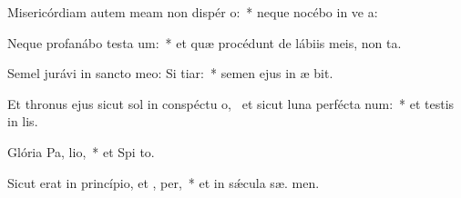 \item Misericórdiam autem meam non dispér  o:~* neque nocébo in ve a:
\item Neque profanábo testa um:~* et quæ procédunt de lábiis meis, non  ta.
\item Semel jurávi in sancto meo: Si  tiar:~* semen ejus in æ bit.
\item Et thronus ejus sicut sol in conspéctu o,~\pscross{} et sicut luna perfécta  num:~* et testis in  lis.
\item Glória Pa,  lio,~* et Spi to.
\item Sicut erat in princípio, et ,  per,~* et in sǽcula sæ. men.
